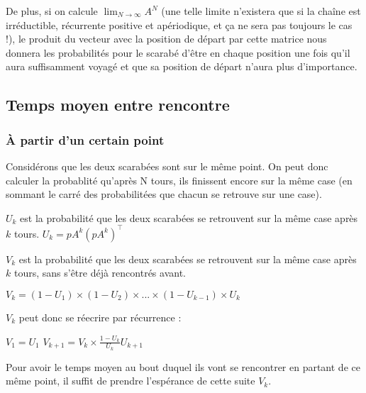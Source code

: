 \documentclass{scrartcl}
\begin{document}
  De plus, si on calcule $\lim_{N \to \infty} A^N$ (une telle limite n'existera que si la chaîne est irréductible,
  récurrente positive et apériodique, et ça ne sera pas toujours le cas !), le produit du vecteur avec la position
  de départ par cette matrice nous donnera les probabilités pour le scarabé d'être en chaque position une fois qu'il
  aura suffisamment voyagé et que sa position de départ n'aura plus d'importance.

\subsection{Temps moyen entre rencontre}

\subsubsection{À partir d'un certain point}

Considérons que les deux scarabées sont sur le même point.
On peut donc calculer la probablité qu'après N tours, ils finissent encore sur la même case (en sommant le carré des probabilitées
que chacun se retrouve sur une case).

$U_k$ est la probabilité que les deux scarabées se retrouvent sur la même case après $k$ tours.
$U_k = pA^k(pA^k)^\intercal$

$V_k$ est la probabilité que les deux scarabées se retrouvent sur la même case après $k$ tours, sans s'être déjà rencontrés avant.

$V_k = (1 - U_1) \times (1 - U_2) \times ... \times (1 - U_{k - 1}) \times U_k$

$V_k$ peut donc se réecrire par récurrence :

$V_1 = U_1$
$V_{k + 1} = V_k \times \frac{1 - U_k}{U_k}U_{k + 1}$

Pour avoir le temps moyen au bout duquel ils vont se rencontrer en partant de ce même point, il suffit de prendre l'espérance de cette suite $V_k$.
\end{document}
